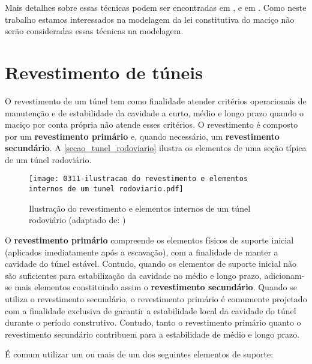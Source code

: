 Mais detalhes sobre essas técnicas podem ser encontradas em  ,  e em . Como neste trabalho estamos interessados na modelagem da lei constitutiva do maciço não serão consideradas essas técnicas na modelagem.

\section{Revestimento de túneis}

O revestimento de um túnel tem como finalidade atender critérios operacionais de manutenção e de estabilidade da cavidade a curto, médio e longo prazo quando o maciço por conta própria não atende esses critérios. O revestimento é composto por um \textbf{revestimento primário} e, quando necessário, um \textbf{revestimento secundário}. A \autoref{secao_tunel_rodoviario} ilustra os elementos de uma seção típica de um túnel rodoviário.

\begin{figure}[H]
	\begin{center}
		\texttt{[image: 0311-ilustracao do revestimento e elementos internos de um tunel rodoviario.pdf]}
	\end{center}
	\caption{\label{secao_tunel_rodoviario}Ilustração do revestimento e elementos internos de um túnel rodoviário (adaptado de: )}
\end{figure}

O \textbf{revestimento primário} compreende os elementos físicos de suporte inicial (aplicados imediatamente após a escavação), com a finalidade de manter a cavidade do túnel estável. Contudo, quando os elementos de suporte inicial não são suficientes para estabilização da cavidade no médio e longo prazo, adicionam-se mais elementos constituindo assim o \textbf{revestimento secundário}. Quando se utiliza o revestimento secundário, o revestimento primário é comumente projetado com a finalidade exclusiva de garantir a estabilidade local da cavidade do túnel durante o período construtivo. Contudo, tanto o revestimento primário quanto o revestimento secundário contribuem para a estabilidade de médio e longo prazo. 

É comum utilizar um ou mais de um dos seguintes elementos de suporte:

